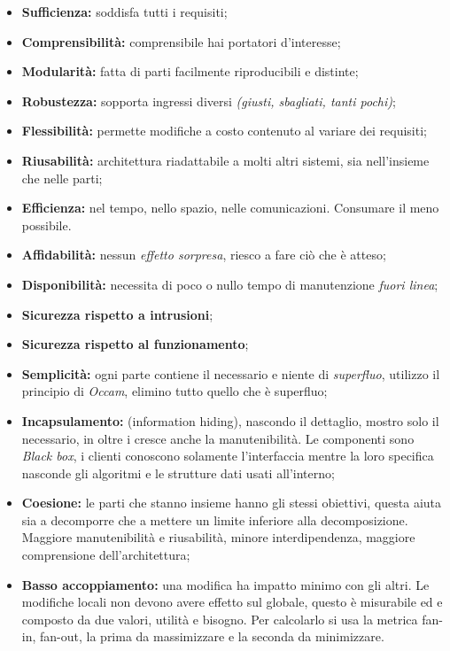 \begin{itemize}

	\item \textbf{Sufficienza:} soddisfa tutti i requisiti;
	\item \textbf{Comprensibilità:} comprensibile hai portatori d'interesse;
	\item \textbf{Modularità:} fatta di parti facilmente riproducibili e distinte;
	\item \textbf{Robustezza:} sopporta ingressi diversi \textit{(giusti, sbagliati, tanti pochi)};
	\item \textbf{Flessibilità:} permette modifiche a costo contenuto al variare dei requisiti;
	\item \textbf{Riusabilità:} architettura riadattabile a molti altri sistemi, sia nell'insieme che nelle parti;
	\item \textbf{Efficienza:} nel tempo, nello spazio, nelle comunicazioni. Consumare il meno possibile.
	\item \textbf{Affidabilità:} nessun \textit{effetto sorpresa}, riesco a fare ciò che è atteso;
	\item \textbf{Disponibilità:} necessita di poco o nullo tempo di manutenzione \textit{fuori linea};
	\item \textbf{Sicurezza rispetto a intrusioni};
	\item \textbf{Sicurezza rispetto al funzionamento};
	\item \textbf{Semplicità:} ogni parte contiene il necessario e niente di \textit{superfluo}, utilizzo il principio di \textit{Occam}, elimino tutto quello che è superfluo;
	\item \textbf{Incapsulamento:} (information hiding), nascondo il dettaglio, mostro solo il necessario, in oltre i cresce anche la manutenibilità. Le componenti sono \textit{Black box}, i clienti conoscono solamente l'interfaccia mentre la loro specifica nasconde gli algoritmi e le strutture dati usati all'interno;
	\item \textbf{Coesione:} le parti che stanno insieme hanno gli stessi obiettivi, questa aiuta sia a decomporre che a mettere un limite inferiore alla decomposizione. Maggiore manutenibilità e riusabilità, minore interdipendenza, maggiore comprensione dell'architettura;
	\item \textbf{Basso accoppiamento:} una modifica ha impatto minimo con gli altri. Le modifiche locali non devono avere effetto sul globale, questo è misurabile ed e composto da due valori, utilità e bisogno. Per calcolarlo si usa la metrica fan-in, fan-out, la prima da massimizzare e la seconda da minimizzare.

\end{itemize}

